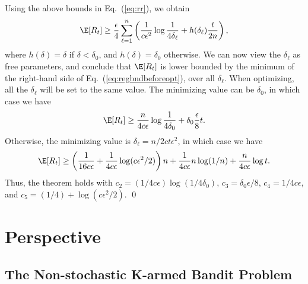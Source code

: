 Using the above bounds in Eq.~(\ref{eq:rr}), we obtain
\begin{equation}
\E [R_t] \ge \frac{\epsilon}{4} \sum_{\ell=1}^n
\left(
\frac{1}{c \epsilon ^2} \log\frac{1}{4 \delta_\ell} + h(\delta_\ell)\frac{t}{2n} \right),
\label{eq:regbndbeforeopt}
\end{equation}
where $h(\delta)=\delta$ if $\delta<\delta_0$, and $h(\delta)=\delta_0$ otherwise.
We can now view the $\delta_\ell$ as free parameters, and conclude that $\E[R_t]$ is
lower bounded by the minimum of the right-hand side of Eq.~(\ref{eq:regbndbeforeopt}),
over all $\delta_{\ell}$.
When optimizing, all the $\delta_\ell$ will be set to the same value. The minimizing value
can be  $\delta_0$, in which case we have
$$
\E [R_t] \ge  \frac{n}{4c \epsilon} \log\frac{1}{4\delta_0} + \delta_0 \frac{\epsilon}{8} t .
$$
Otherwise, the minimizing value is
$\delta_\ell = n/2c t \epsilon ^2$, in which case we have
$$
\E [R_t] \ge \left( \frac{1}{16 c \epsilon} + \frac{1}{4c \epsilon} \log(c \epsilon ^2/2)\right) n + \frac{1}{4c \epsilon} n \log(1/n) + \frac{n}{4c \epsilon}\log t.
$$
Thus,
the theorem holds with $c_2 = (1/4c \epsilon) \log (1/4\delta_0)$, $c_3 = \delta_0 \epsilon /8$,
$c_4 = 1/4c \epsilon $,  and $c_5 = (1/4) +\log(c \epsilon ^2/2)$.
\qed


%
%
%
%
%
%
%
%
\section{Perspective}

\subsection{The Non-stochastic K-armed Bandit Problem}

